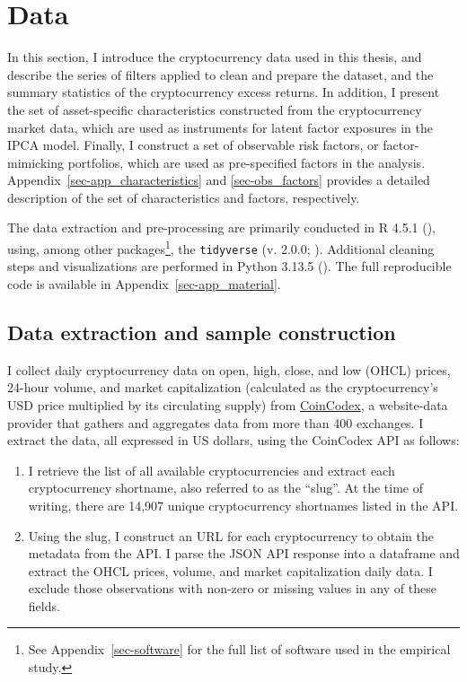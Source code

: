 \documentclass[
  12pt,
  a4paper,
  openany]{scrbook}
\begin{document}

\chapter{Data}\label{sec-data}

In this section, I introduce the cryptocurrency data used in this
thesis, and describe the series of filters applied to clean and prepare
the dataset, and the summary statistics of the cryptocurrency excess
returns. In addition, I present the set of asset-specific
characteristics constructed from the cryptocurrency market data, which
are used as instruments for latent factor exposures in the IPCA model.
Finally, I construct a set of observable risk factors, or
factor-mimicking portfolios, which are used as pre-specified factors in
the analysis. Appendix~\ref{sec-app_characteristics} and
\ref{sec-obs_factors} provides a detailed description of the set of
characteristics and factors, respectively.

The data extraction and pre-processing are primarily conducted in R
4.5.1 (), using, among other
packages\footnote{See Appendix~\ref{sec-software} for the full list of
  software used in the empirical study.}, the \texttt{tidyverse} (v.
2.0.0; ). Additional
cleaning steps and visualizations are performed in Python 3.13.5
(). The full
reproducible code is available in Appendix~\ref{sec-app_material}.

\section{Data extraction and sample
construction}\label{data-extraction-and-sample-construction}

I collect daily cryptocurrency data on open, high, close, and low (OHCL)
prices, 24-hour volume, and market capitalization (calculated as the
cryptocurrency's USD price multiplied by its circulating supply) from
\href{https://coincodex.com/}{CoinCodex}, a website-data provider that
gathers and aggregates data from more than 400 exchanges. I extract the
data, all expressed in US dollars, using the CoinCodex API as follows:

\begin{enumerate}
\def\labelenumi{\arabic{enumi}.}
\item
  I retrieve the list of all available cryptocurrencies and extract each
  cryptocurrency shortname, also referred to as the ``slug''. At the
  time of writing, there are 14,907 unique cryptocurrency shortnames
  listed in the API.
\item
  Using the slug, I construct an URL for each cryptocurrency to obtain
  the metadata from the API. I parse the JSON API response into a
  dataframe and extract the OHCL prices, volume, and market
  capitalization daily data. I exclude those observations with non-zero
  or missing values in any of these fields.
\end{enumerate}
\end{document}

